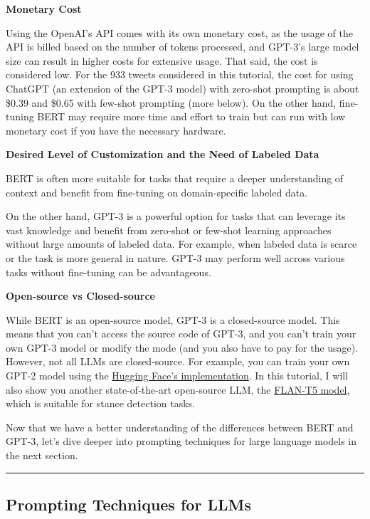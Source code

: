 \documentclass[11pt]{article}
\begin{document}
\textbf{Monetary Cost}

Using the OpenAI's API comes with its own monetary cost, as the usage of
the API is billed based on the number of tokens processed, and GPT-3's
large model size can result in higher costs for extensive usage. That
said, the cost is considered low. For the 933 tweets considered in this
tutorial, the cost for using ChatGPT (an extension of the GPT-3 model)
with zero-shot prompting is about \$0.39 and \$0.65 with few-shot
prompting (more below). On the other hand, fine-tuning BERT may require
more time and effort to train but can run with low monetary cost if you
have the necessary hardware.

\textbf{Desired Level of Customization and the Need of Labeled Data}

BERT is often more suitable for tasks that require a deeper
understanding of context and benefit from fine-tuning on domain-specific
labeled data.

On the other hand, GPT-3 is a powerful option for tasks that can
leverage its vast knowledge and benefit from zero-shot or few-shot
learning approaches without large amounts of labeled data. For example,
when labeled data is scarce or the task is more general in nature. GPT-3
may perform well across various tasks without fine-tuning can be
advantageous.

\textbf{Open-source vs Closed-source}

While BERT is an open-source model, GPT-3 is a closed-source model. This
means that you can't access the source code of GPT-3, and you can't
train your own GPT-3 model or modify the mode (and you also have to pay
for the usage). However, not all LLMs are closed-source. For example,
you can train your own GPT-2 model using the
\href{https://huggingface.co/transformers/model_doc/gpt2.html}{Hugging
Face's implementation}. In this tutorial, I will also show you another
state-of-the-art open-source LLM, the
\href{https://huggingface.co/docs/transformers/model_doc/FLAN-T5}{FLAN-T5
model}, which is suitable for stance detection tasks.

Now that we have a better understanding of the differences between BERT
and GPT-3, let's dive deeper into prompting techniques for large
language models in the next section.

    \begin{center}\rule{0.5\linewidth}{0.5pt}\end{center}

    \hypertarget{prompting-techniques-for-llms}{%
\subsection{Prompting Techniques for
LLMs}\label{prompting-techniques-for-llms}}
\end{document}
